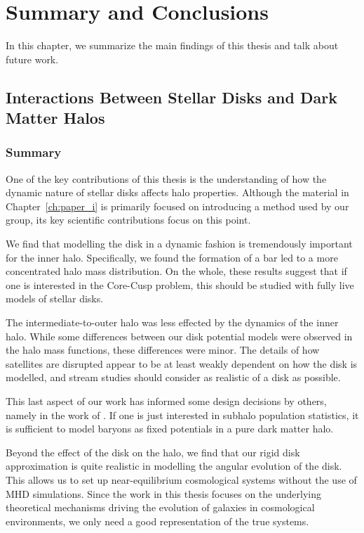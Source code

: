 \chapter{Summary and Conclusions}\label{ch:Conclusion}

In this chapter, we summarize the  main findings of this thesis and talk about future work.


\section{Interactions Between Stellar Disks and Dark Matter Halos}


\subsection{Summary}

One of the key contributions of this thesis is the understanding of how the dynamic nature of stellar disks affects halo properties. Although the material in Chapter~\ref{ch:paper_i} is primarily focused on introducing a method used by our group, its key scientific contributions focus on this point.

We find that modelling the disk in a dynamic fashion is tremendously important for the inner halo. Specifically, we found the formation of a bar led to a more concentrated halo mass distribution. On the whole, these results suggest that if one is interested in the Core-Cusp problem, this should be studied with fully live models of stellar disks.

The intermediate-to-outer halo was less effected by the dynamics of the inner halo. While some differences between our disk potential models were observed in the halo mass functions, these differences were minor. The details of how satellites are disrupted appear to be at least weakly dependent on how the disk is modelled, and stream studies should consider as realistic of a disk as possible.

This last aspect of our work has informed some design decisions by others, namely in the work of \citet{read_2019}. If one is just interested in subhalo population statistics, it is sufficient to model baryons as fixed potentials in a pure dark matter halo. 

Beyond the effect of the disk on the halo, we find that our rigid disk approximation is quite realistic in modelling the angular evolution of the disk. This allows us to set up near-equilibrium cosmological systems without the use of MHD simulations. Since the work in this thesis focuses on the underlying theoretical mechanisms driving the evolution of galaxies in cosmological environments, we only need a good representation of the true systems.

